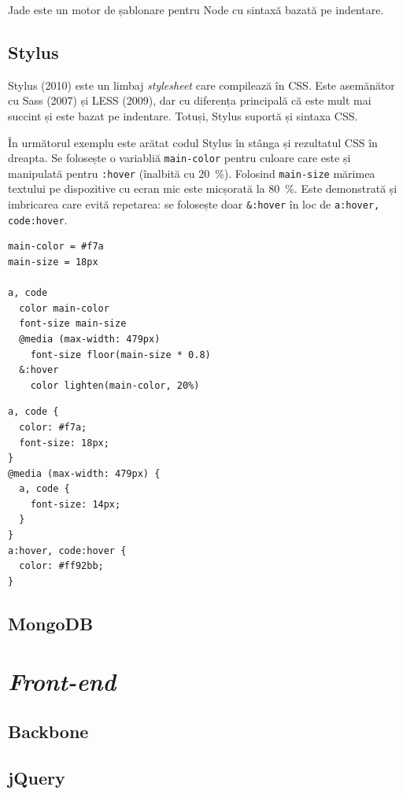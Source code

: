\documentclass[a4wide,12pt]{report}
\newcommand{\eng}[1]{\emph{#1}} %
\newcommand{\cod}[1]{\texttt{#1}}
\begin{document}
Jade este un motor de șablonare pentru Node cu sintaxă bazată pe indentare.

\subsection{Stylus}

Stylus (2010) este un limbaj \eng{stylesheet} care compilează în CSS. Este
asemănător cu Sass (2007) și LESS (2009), dar cu diferența principală că este
mult mai succint și este bazat pe indentare. Totuși, Stylus suportă și sintaxa
CSS.

În următorul exemplu este arătat codul Stylus în stânga și rezultatul CSS în
dreapta. Se folosește o variabliă \cod{main-color} pentru culoare care este și
manipulată pentru \cod{:hover} (înalbită cu 20~\%). Folosind \cod{main-size}
mărimea textului pe dispozitive cu ecran mic este micșorată la 80~\%. Este
demonstrată și imbricarea care evită repetarea: se folosește doar \cod{\&:hover}
în loc de \cod{a:hover, code:hover}.

\minipage{9cm}
\begin{verbatim}
main-color = #f7a
main-size = 18px

a, code
  color main-color
  font-size main-size
  @media (max-width: 479px)
    font-size floor(main-size * 0.8)
  &:hover
    color lighten(main-color, 20%)
\end{verbatim}
\endminipage
\minipage{4cm}
\begin{verbatim}
a, code {
  color: #f7a;
  font-size: 18px;
}
@media (max-width: 479px) {
  a, code {
    font-size: 14px;
  }
}
a:hover, code:hover {
  color: #ff92bb;
}
\end{verbatim}
\endminipage

\subsection{MongoDB}

\section{\eng{Front-end}}

\subsection{Backbone}

\subsection{jQuery}
\end{document}
